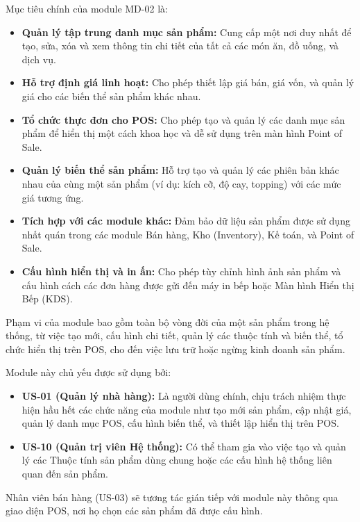 \label{sssec:md02_objectives_scope}
Mục tiêu chính của module MD-02 là:
\begin{itemize}
    \item \textbf{Quản lý tập trung danh mục sản phẩm:} Cung cấp một nơi duy nhất để tạo, sửa, xóa và xem thông tin chi tiết của tất cả các món ăn, đồ uống, và dịch vụ.
    \item \textbf{Hỗ trợ định giá linh hoạt:} Cho phép thiết lập giá bán, giá vốn, và quản lý giá cho các biến thể sản phẩm khác nhau.
    \item \textbf{Tổ chức thực đơn cho POS:} Cho phép tạo và quản lý các danh mục sản phẩm để hiển thị một cách khoa học và dễ sử dụng trên màn hình Point of Sale.
    \item \textbf{Quản lý biến thể sản phẩm:} Hỗ trợ tạo và quản lý các phiên bản khác nhau của cùng một sản phẩm (ví dụ: kích cỡ, độ cay, topping) với các mức giá tương ứng.
    \item \textbf{Tích hợp với các module khác:} Đảm bảo dữ liệu sản phẩm được sử dụng nhất quán trong các module Bán hàng, Kho (Inventory), Kế toán, và Point of Sale.
    \item \textbf{Cấu hình hiển thị và in ấn:} Cho phép tùy chỉnh hình ảnh sản phẩm và cấu hình cách các đơn hàng được gửi đến máy in bếp hoặc Màn hình Hiển thị Bếp (KDS).
\end{itemize}
Phạm vi của module bao gồm toàn bộ vòng đời của một sản phẩm trong hệ thống, từ việc tạo mới, cấu hình chi tiết, quản lý các thuộc tính và biến thể, tổ chức hiển thị trên POS, cho đến việc lưu trữ hoặc ngừng kinh doanh sản phẩm.

\label{sssec:md02_primary_users}
Module này chủ yếu được sử dụng bởi:
\begin{itemize}
    \item \textbf{US-01 (Quản lý nhà hàng):} Là người dùng chính, chịu trách nhiệm thực hiện hầu hết các chức năng của module như tạo mới sản phẩm, cập nhật giá, quản lý danh mục POS, cấu hình biến thể, và thiết lập hiển thị trên POS.
    \item \textbf{US-10 (Quản trị viên Hệ thống):} Có thể tham gia vào việc tạo và quản lý các Thuộc tính sản phẩm dùng chung hoặc các cấu hình hệ thống liên quan đến sản phẩm.
\end{itemize}
Nhân viên bán hàng (US-03) sẽ tương tác gián tiếp với module này thông qua giao diện POS, nơi họ chọn các sản phẩm đã được cấu hình.

